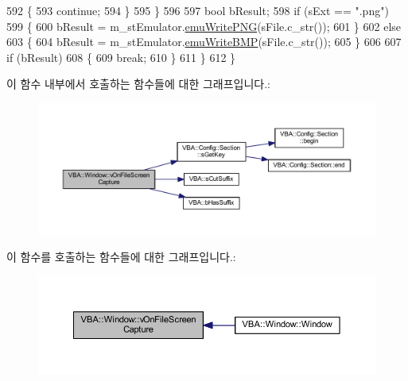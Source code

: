 \begin{DoxyCode}
592       \{
593         \textcolor{keywordflow}{continue};
594       \}
595     \}
596 
597     \textcolor{keywordtype}{bool} bResult;
598     \textcolor{keywordflow}{if} (sExt == \textcolor{stringliteral}{".png"})
599     \{
600       bResult = m\_stEmulator.\mbox{\hyperlink{struct_emulated_system_a741364ed335ac65cc30c6749896274bc}{emuWritePNG}}(sFile.c\_str());
601     \}
602     \textcolor{keywordflow}{else}
603     \{
604       bResult = m\_stEmulator.\mbox{\hyperlink{struct_emulated_system_a3196ed548c01811a8c482294d68ec56b}{emuWriteBMP}}(sFile.c\_str());
605     \}
606 
607     \textcolor{keywordflow}{if} (bResult)
608     \{
609       \textcolor{keywordflow}{break};
610     \}
611   \}
612 \}
\end{DoxyCode}
이 함수 내부에서 호출하는 함수들에 대한 그래프입니다.\+:
\nopagebreak
\begin{figure}[H]
\begin{center}
\leavevmode
\includegraphics[width=350pt]{class_v_b_a_1_1_window_ae96308c56cf84f9c56dc97c196adc49c_cgraph}
\end{center}
\end{figure}
이 함수를 호출하는 함수들에 대한 그래프입니다.\+:
\nopagebreak
\begin{figure}[H]
\begin{center}
\leavevmode
\includegraphics[width=350pt]{class_v_b_a_1_1_window_ae96308c56cf84f9c56dc97c196adc49c_icgraph}
\end{center}
\end{figure}
\mbox{\label{class_v_b_a_1_1_window_ad73fe13a9e4c8b40fbe6f0726210cc5c}} 
